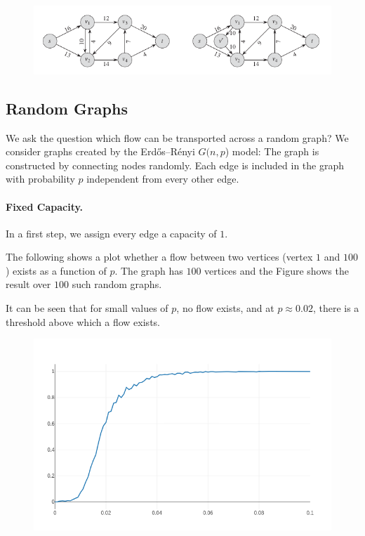 \begin{figure}[H]
\centering
\includegraphics[scale=0.65]{images/max_flow_04_02.png}
\end{figure}


\subsection{Random Graphs}

We ask the question which flow can be transported across a random graph? We consider graphs created by the Erdős–Rényi $G(n,p$) model: The graph is constructed by connecting nodes randomly. Each edge is included in the graph with probability $p$ independent from every other edge.

\paragraph{Fixed Capacity.} In a first step, we assign every edge a capacity of $1$.

The following shows a plot whether a flow between two vertices (vertex $1$ and $100$) exists as a function of $p$. The graph has $100$ vertices and the Figure shows the result over $100$ such random graphs.

It can be seen that for small values of $p$, no flow exists, and at $p \approx 0.02$, there is a threshold above which a flow exists.

\begin{figure}[H]
\centering
\includegraphics[scale=0.45]{images/max_flow_04_03.png}
\end{figure}

